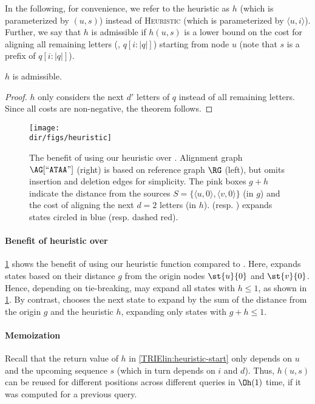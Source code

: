 In the following, for convenience, we refer to the heuristic as $h$ (which is
parameterized by $(u,s)$) instead of \textsc{Heuristic} (which is parameterized
by $\langle u, i \rangle$). Further, we say that $h$ is admissible if $h(u,s)$
is a lower bound on the cost for aligning all remaining letters (\ie,
$q[i{:}|q|]$) starting from node $u$ (note that $s$ is a prefix of
$q[i{:}|q|]$).

\begin{samepage}
\begin{thm} \label{TRIEthm:admissible}
	$h$ is admissible.
\end{thm}
\begin{proof}
$h$ only considers the next $d'$ letters of $q$ instead of all
remaining letters. Since all costs are non-negative, the theorem follows.
\end{proof}
\end{samepage}

\begin{figure}[H]
	\centering
	\texttt{[image: \\dir/figs/heuristic]}
	\caption[Toy example when \A is preferrable to \dijkstra]{The benefit of using our heuristic over \dijkstra. Alignment graph
	$\AG[``\texttt{ATAA}"]$ (right) is based on reference graph $\RG$ (left),
	but omits insertion and deletion edges for simplicity. The pink boxes $g+h$
	indicate the distance from the sources $S=\{\langle u,0 \rangle, \langle v,0
	\rangle \}$ (in $g$) and the cost of aligning the next $d=2$ letters (in
	$h$). \dijkstra (resp. \A) expands states circled in
	\textcolor{my-full-blue}{blue} (resp.
	\textcolor{my-full-red}{dashed red}).}
	\label{TRIEfig:heuristic-benefit}
\end{figure}

\paragraph{Benefit of \A heuristic over \dijkstra} \label{TRIEpara:heuristic-benefits}
\cref{TRIEfig:heuristic-benefit} shows the benefit of using our heuristic function
compared to \dijkstra. Here, \dijkstra expands states based on their distance
$g$ from the origin nodes $\st{u}{0}$ and $\st{v}{0}$. Hence, depending on
tie-breaking, \dijkstra may expand all states with $h \leq 1$, as shown in
\cref{TRIEfig:heuristic-benefit}. By contrast, \A chooses the next state to expand
by the sum of the distance from the origin $g$ and the heuristic $h$, expanding
only states with $g+h \leq 1$.

\paragraph{Memoization} \label{TRIEpara:memoization}
Recall that the return value of $h$ in \cref{TRIElin:heuristic-start} only depends
on $u$ and the upcoming sequence $s$ (which in turn depends on $i$ and $d$).
Thus, $h(u,s)$ can be reused for different positions across different queries in
$\Oh(1)$ time, if it was computed for a previous query.